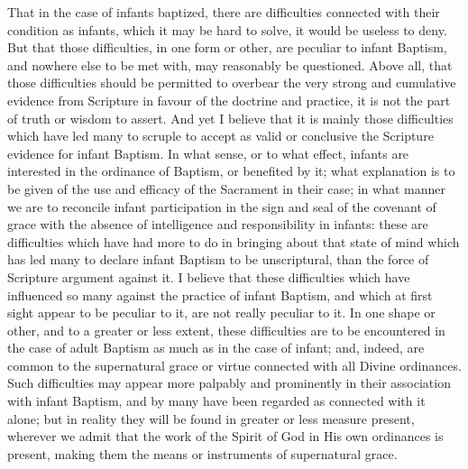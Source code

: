 \documentclass[
]{book}
\begin{document}
That in the case of infants baptized, there are difficulties connected with their condition as infants, which it may be hard to solve, it would be useless to deny. But that those difficulties, in one form or other, are peculiar to infant Baptism, and nowhere else to be met with, may reasonably be questioned. Above all, that those difficulties should be permitted to overbear the very strong and cumulative evidence from Scripture in favour of the doctrine and practice, it is not the part of truth or wisdom to assert. And yet I believe that it is mainly those difficulties which have led many to scruple to accept as valid or conclusive the Scripture evidence for infant Baptism. In what sense, or to what effect, infants are interested in the ordinance of Baptism, or benefited by it; what explanation is to be given of the use and efficacy of the Sacrament in their case; in what manner we are to reconcile infant participation in the sign and seal of the covenant of grace with the absence of intelligence and responsibility in infants: these are difficulties which have had more to do in bringing about that state of mind which has led many to declare infant Baptism to be unscriptural, than the force of Scripture argument against it. I believe that these difficulties which have influenced so many against the practice of infant Baptism, and which at first sight appear to be peculiar to it, are not really peculiar to it. In one shape or other, and to a greater or less extent, these difficulties are to be encountered in the case of adult Baptism as much as in the case of infant; and, indeed, are common to the supernatural grace or virtue connected with all Divine ordinances. Such difficulties may appear more palpably and prominently in their association with infant Baptism, and by many have been regarded as connected with it alone; but in reality they will be found in greater or less measure present, wherever we admit that the work of the Spirit of God in His own ordinances is present, making them the means or instruments of supernatural grace.
\end{document}
